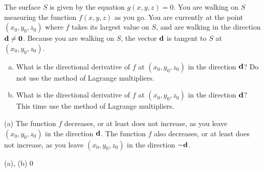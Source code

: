 \begin{question}
The surface $S$ is given by the equation $g(x,y,z)=0$.
You are walking on $S$ measuring the function $f(x,y,z)$ as you go. 
You are currently at the point $(x_0,y_0,z_0)$ where $f$ takes its 
largest value on $S$, and are walking in the direction $\mathbf{d}\ne\mathbf{0}$. Because 
you are walking on $S$, the vector $\mathbf{d}$ is tangent to $S$ at $(x_0,y_0,z_0)$. 
\begin{enumerate}[(a)]
\item
What is the directional derivative of $f$ at $(x_0,y_0,z_0)$ in 
the direction $\mathbf{d}$? Do not use the method of Lagrange multipliers.
\item
What is the directional derivative of $f$ at $(x_0,y_0,z_0)$ in 
the direction $\mathbf{d}$? This time use the method of Lagrange multipliers.
\end{enumerate}
\end{question}

\begin{hint}
(a) The function $f$ decreases, or at least does not increase, as you leave 
$(x_0,y_0,z_0)$ in the direction $\mathbf{d}$.  
The function $f$ also decreases, or at least does not increase, as you leave 
$(x_0,y_0,z_0)$ in the direction $-\mathbf{d}$.
\end{hint}

\begin{answer}
(a), (b) $0$
\end{answer}


